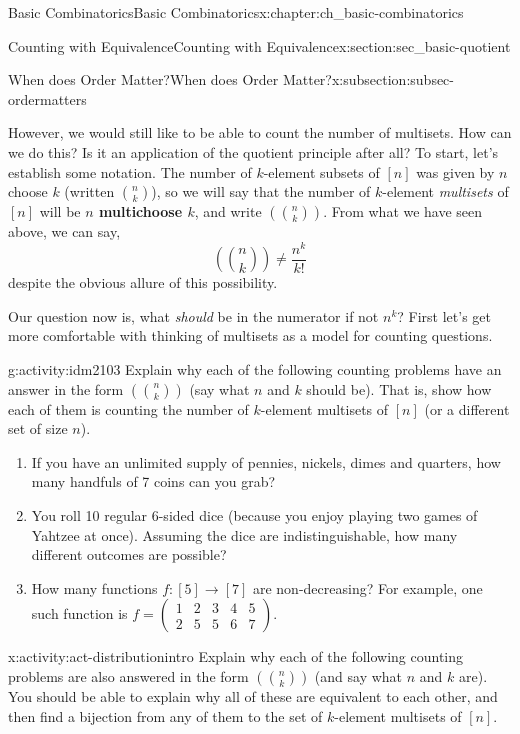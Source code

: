 \documentclass[oneside,10pt,]{book}
\newcommand{\terminology}[1]{\textbf{#1}}
\numberwithin{equation}{chapter}
\newcommand{\mchoose}[2]{\left(\!\binom{#1}{#2}\!\right)}
\newcommand{\twoline}[2]{\begin{pmatrix}#1 \\ #2 \end{pmatrix}}
\newcommand{\amp}{&}
\begin{document}
\begin{chapterptx}{Basic Combinatorics}{}{Basic Combinatorics}{}{}{x:chapter:ch_basic-combinatorics}
\begin{sectionptx}{Counting with Equivalence}{}{Counting with Equivalence}{}{}{x:section:sec_basic-quotient}
\begin{subsectionptx}{When does Order Matter?}{}{When does Order Matter?}{}{}{x:subsection:subsec-ordermatters}
\par
However, we would still like to be able to count the number of multisets.  How can we do this?  Is it an application of the quotient principle after all?  To start, let's establish some notation.  The number of \(k\)-element subsets of \([n]\) was given by \(n\) choose \(k\) (written \(\binom{n}{k}\)), so we will say that the number of \(k\)-element \emph{multisets} of \([n]\) will be \terminology{\(n\) multichoose \(k\)}, and write \(\mchoose{n}{k}\).  From what we have seen above, we can say,%
\begin{equation*}
\mchoose{n}{k} \ne \frac{n^k}{k!}
\end{equation*}
despite the obvious allure of this possibility.%
\par
Our question now is, what \emph{should} be in the numerator if not \(n^k\)?  First let's get more comfortable with thinking of multisets as a model for counting questions.%
\begin{activity}{}{g:activity:idm2103}%
Explain why each of the following counting problems have an answer in the form \(\mchoose{n}{k}\) (say what \(n\) and \(k\) should be).  That is, show how each of them is counting the number of \(k\)-element multisets of \([n]\) (or a different set of size \(n\)).%
\begin{enumerate}[font=\bfseries,label=(\alph*),ref=\alph*]
\item{}If you have an unlimited supply of pennies, nickels, dimes and quarters, how many handfuls of 7 coins can you grab?%
\item{}You roll 10 regular 6-sided dice (because you enjoy playing two games of Yahtzee at once).  Assuming the dice are indistinguishable, how many different outcomes are possible?%
\item{}How many functions \(f:[5] \to [7]\) are non-decreasing?  For example, one such function is \(f = \twoline{1 \amp 2 \amp 3 \amp 4 \amp 5}{2 \amp 5 \amp 5 \amp 6 \amp 7}\).%
\end{enumerate}
\end{activity}
\begin{activity}{}{x:activity:act-distributionintro}%
Explain why each of the following counting problems are also answered in the form \(\mchoose{n}{k}\) (and say what \(n\) and \(k\) are).  You should be able to explain why all of these are equivalent to each other, and then find a bijection from any of them to the set of \(k\)-element multisets of \([n]\).%
\begin{enumerate}[font=\bfseries,label=(\alph*),ref=\alph*]

\end{enumerate}
\end{activity}
\end{subsectionptx}
\end{sectionptx}
\end{chapterptx}
\end{document}
